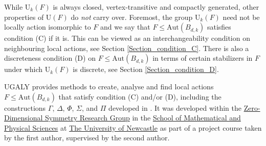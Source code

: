 \documentclass[a4paper,11pt]{report}
\begin{document}
{ While $\mathrm{U}_{k}(F)$ is always closed, vertex-transitive and compactly generated, other properties
of $\mathrm{U}(F)$ do \emph{not} carry over. Foremost, the group $\mathrm{U}_{k}(F)$ need not be locally action isomorphic to $F$ and we say that $F\le\mathrm{Aut}(B_{d,k})$ satisfies condition (C) if it is. This can be viewed as an interchangeability
condition on neighbouring local actions, see Section \ref{Section_condition_C}. There is also a discreteness condition (D) on $F\le\mathrm{Aut}(B_{d,k})$ in terms of certain stabilizers in $F$ under which $\mathrm{U}_{k}(F)$ is discrete, see Section \ref{Section_condition_D}. 

 \textsf{UGALY} provides methods to create, analyse and find local actions $F\le\mathrm{Aut}(B_{d,k})$ that satisfy condition (C) and/or (D), including the constructions $\Gamma$, $\Delta$, $\Phi$, $\Sigma$, and $\Pi$ developed in \cite{Tor20}. It was developed within the \href{ https://zerodimensional.group/"} {Zero-Dimensional Symmetry Research Group} in the \href{ https://www.newcastle.edu.au/school/mathematical-and-physical-sciences} {School of Mathematical and Physical Sciences} at \href{ https://www.newcastle.edu.au/} {The University of Newcastle} as part of a project course taken by the first author, supervised by the
second author. }

   
\end{document}
